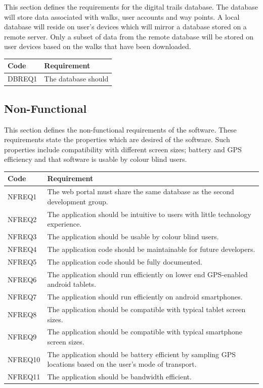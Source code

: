 \documentclass[11pt,a4paper]{article}
\begin{document}
This section defines the requirements for the digital trails database.
The database will store data associated with walks, user accounts and way points.
A local database will reside on user's devices which will mirror a database stored on a remote server.
Only a subset of data from the remote database will be stored on user devices based on the walks that have been downloaded.

\begin{longtable}{|p{2.5cm}p{13cm}|}
\hline
\textbf{Code} & \textbf{Requirement} \\
\hline
DBREQ1 & The database should  \\ \hline

\end{longtable}

\subsection{Non-Functional}
\label{sec:non-func-reqs}

This section defines the non-functional requirements of the software.
These requirements state the properties which are desired of the software.
Such properties include compatibility with different screen sizes; battery and GPS efficiency and that software is usable by colour blind users.

\begin{longtable}{|p{2.5cm}p{13cm}|}
\hline
\textbf{Code} & \textbf{Requirement} \\

\hline
NFREQ1 & The web portal must share the same database as the second development group. \\ \hline
NFREQ2 & The application should be intuitive to users with little technology experience. \\ \hline
NFREQ3 & The application should be usable by colour blind users. \\ \hline
NFREQ4 & The application code should be maintainable for future developers. \\ \hline
NFREQ5 & The application code should be fully documented. \\ \hline
NFREQ6 & The application should run efficiently on lower end GPS-enabled android tablets. \\ \hline
NFREQ7 & The application should run efficiently on android smartphones. \\ \hline
NFREQ8 & The application should be compatible with typical tablet screen sizes. \\ \hline
NFREQ9 & The application should be compatible with typical smartphone screen sizes. \\ \hline
NFREQ10 & The application should be battery efficient by sampling GPS locations based on the user's mode of transport. \\ \hline
NFREQ11 & The application should be bandwidth efficient. \\ \hline
\end{longtable}
\end{document}
